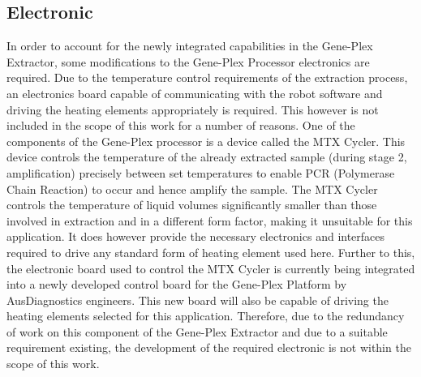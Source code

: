 \subsection{Electronic}
\label{sec:intro_electronics}
In order to account for the newly integrated capabilities in the Gene-Plex Extractor, some modifications to the Gene-Plex Processor electronics are required. Due to the temperature control requirements of the extraction process, an electronics board capable of communicating with the robot software and driving the heating elements appropriately is required. This however is not included in the scope of this work for a number of reasons. One of the components of the Gene-Plex processor is a device called the MTX Cycler. This device controls the temperature of the already extracted sample (during stage 2, amplification) precisely between set temperatures to enable PCR (Polymerase Chain Reaction) to occur and hence amplify the sample. The MTX Cycler controls the temperature of liquid volumes significantly smaller than those involved in extraction and in a different form factor, making it unsuitable for this application. It does however provide the necessary electronics and interfaces required to drive any standard form of heating element used here. Further to this, the electronic board used to control the MTX Cycler is currently being integrated into a newly developed control board for the Gene-Plex Platform by AusDiagnostics engineers. This new board will also be capable of driving the heating elements selected for this application. Therefore, due to the redundancy of work on this component of the Gene-Plex Extractor and due to a suitable requirement existing, the development of the required electronic is not within the scope of this work.

